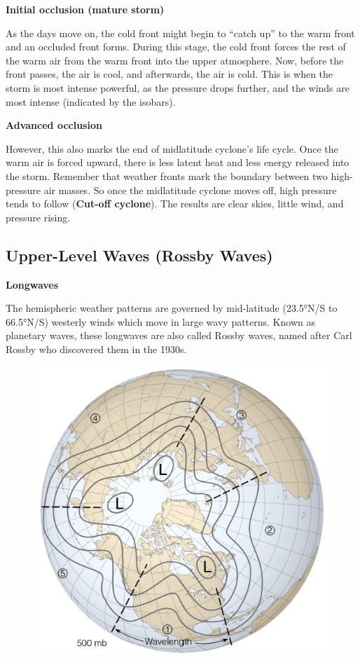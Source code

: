 \documentclass[12pt,oneside]{book}
\begin{document}
\textbf{Initial occlusion (mature storm)}

As the days move on, the cold front might begin to ``catch up'' to the
warm front and an occluded front forms. During this stage, the cold
front forces the rest of the warm air from the warm front into the upper
atmosphere. Now, before the front passes, the air is cool, and
afterwards, the air is cold. This is when the storm is most intense
powerful, as the pressure drops further, and the winds are most intense
(indicated by the isobars).

\textbf{Advanced occlusion}

However, this also marks the end of midlatitude cyclone's life cycle.
Once the warm air is forced upward, there is less latent heat and less
energy released into the storm. Remember that weather fronts mark the
boundary between two high-pressure air masses. So once the midlatitude
cyclone moves off, high pressure tends to follow (\textbf{Cut-off
cyclone}). The results are clear skies, little wind, and pressure
rising.

\subsection{Upper-Level Waves (Rossby
Waves)}\label{upper-level-waves-rossby-waves}

\textbf{Longwaves}

The hemispheric weather patterns are governed by mid-latitude (23.5°N/S
to 66.5°N/S) westerly winds which move in large wavy patterns. Known as
planetary waves, these longwaves are also called Rossby waves, named
after Carl Rossby who discovered them in the 1930s.

\begin{figure}

{\centering \includegraphics[width=0.8\linewidth]{figures/Figure632a} 

}

\caption{ }\label{fig:Fig632a}
\end{figure}
\end{document}
